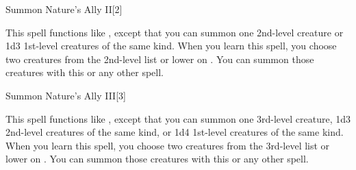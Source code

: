 \begin{spellsection}{Summon Nature's Ally II}[2]
    \begin{spellheader}
    \end{spellheader}
    \begin{spellcontent}
        \begin{spelltargetinginfo}
        \end{spelltargetinginfo}
        \begin{spelleffects}
            \spellspecial This spell functions like , except that you can summon one 2nd-level creature or 1d3 1st-level creatures of the same kind. When you learn this spell, you choose two creatures from the 2nd-level list or lower on . You can summon those creatures with this or any other  spell.
            \spelldur \durshort \dismissable
        \end{spelleffects}
    \end{spellcontent}
    \begin{spellfooter}
        \miscastexplode
    \end{spellfooter}
\end{spellsection}

\begin{spellsection}{Summon Nature's Ally III}[3]
    \begin{spellheader}
    \end{spellheader}
    \begin{spellcontent}
        \begin{spelltargetinginfo}
        \end{spelltargetinginfo}
        \begin{spelleffects}
            \spellspecial This spell functions like , except that you can summon one 3rd-level creature, 1d3 2nd-level creatures of the same kind, or 1d4 1st-level creatures of the same kind. When you learn this spell, you choose two creatures from the 3rd-level list or lower on . You can summon those creatures with this or any other  spell.
            \spelldur \durshort \dismissable
        \end{spelleffects}
    \end{spellcontent}
    \begin{spellfooter}
        \miscastexplode
    \end{spellfooter}
\end{spellsection}

